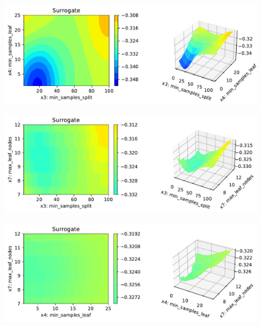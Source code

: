 \documentclass[
  letterpaper,
  DIV=11,
  numbers=noendperiod]{scrreprt}
\begin{document}
\begin{figure}[H]

{\centering \includegraphics{16_spot_hpt_sklearn_multiclass_classification_randomforest_files/figure-pdf/cell-49-output-9.pdf}

}

\end{figure}

\begin{figure}[H]

{\centering \includegraphics{16_spot_hpt_sklearn_multiclass_classification_randomforest_files/figure-pdf/cell-49-output-10.pdf}

}

\end{figure}

\begin{figure}[H]

{\centering \includegraphics{16_spot_hpt_sklearn_multiclass_classification_randomforest_files/figure-pdf/cell-49-output-11.pdf}

}

\end{figure}
\end{document}
